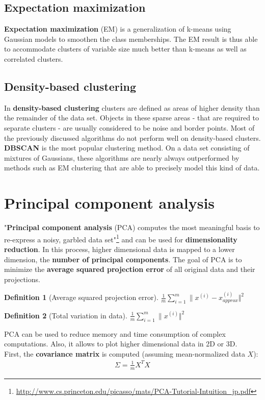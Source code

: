\documentclass{report}
\newtheorem{definition}{Definition}[section]
\begin{document}
\subsection{Expectation maximization}
{\bf Expectation maximization} (EM) is a generalization of k-means using Gaussian models to smoothen the class memberships. The EM result is thus able to accommodate clusters of variable size much better than k-means as well as correlated clusters.

\subsection{Density-based clustering}
In {\bf density-based clustering} clusters are defined as areas of higher density than the remainder of the data set.
Objects in these sparse areas - that are required to separate clusters - are usually considered to be noise and border points.
Most of the previously discussed algorithms do not perform well on density-based clusters.
{\bf DBSCAN} is the most popular clustering method.
On a data set consisting of mixtures of Gaussians, these algorithms are nearly always outperformed by methods such as EM clustering that are able to precisely model this kind of data.


\section{Principal component analysis}
\label{chapter:pca}
"{\bf Principal component analysis} (PCA) computes the most meaningful basis to re-express a noisy, garbled data set"\footnote{\url{http://www.cs.princeton.edu/picasso/mats/PCA-Tutorial-Intuition_jp.pdf}} and can be used for {\bf dimensionality reduction}.
In this process, higher dimensional data is mapped to a lower dimension, the {\bf number of principal components}.
The goal of PCA is to minimize the {\bf average squared projection error} of all original data and their projections.

\begin{definition}[Average squared projection error]
$\frac{1}{m}\sum_{i=1}^m \lVert x^{(i)}-x_{approx}^{(i)} \Vert^2$
\end{definition}

\begin{definition}[Total variation in data]
$\frac{1}{m}\sum_{i=1}^m \lVert x^{(i)} \Vert^2$
\end{definition}

PCA can be used to reduce memory and time consumption of complex computations. Also, it allows to plot higher dimensional data in 2D or 3D.
\\
First, the {\bf covariance matrix} is computed (assuming mean-normalized data $X$):
\begin{align*}
\Sigma = \frac{1}{m}X^TX
\end{align*}
\end{document}

